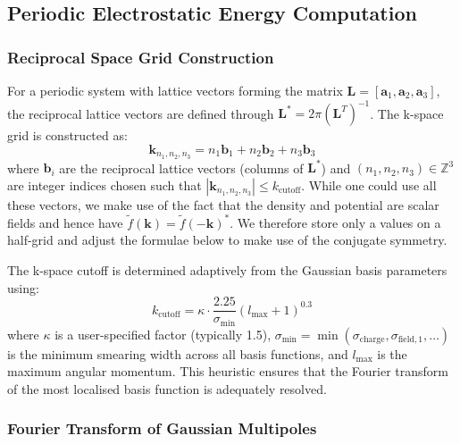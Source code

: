 \documentclass[aps,%
superscriptaddress,
 amsmath,amssymb,
floatfix,
twocolumn
]{revtex4-2}
\begin{document}
\subsection{Periodic Electrostatic Energy Computation}
\label{sec:si_periodic_electrostatics}

\subsubsection{Reciprocal Space Grid Construction}

For a periodic system with lattice vectors forming the matrix $\mathbf{L} = [\mathbf{a}_1, \mathbf{a}_2, \mathbf{a}_3]$, the reciprocal lattice vectors are defined through $\mathbf{L}^* = 2\pi(\mathbf{L}^T)^{-1}$. The k-space grid is constructed as:
\begin{equation}
\mathbf{k}_{n_1,n_2,n_3} = n_1 \mathbf{b}_1 + n_2 \mathbf{b}_2 + n_3 \mathbf{b}_3
\end{equation}
where $\mathbf{b}_i$ are the reciprocal lattice vectors (columns of $\mathbf{L}^*$) and $(n_1, n_2, n_3) \in \mathbb{Z}^3$ are integer indices chosen such that $|\mathbf{k}_{n_1,n_2,n_3}| \leq k_{\text{cutoff}}$. While one could use all these vectors, we make use of the fact that the density and potential are scalar fields and hence have $\tilde{f}(\mathbf{k}) = \tilde{f}(-\mathbf{k})^*$. We therefore store only a values on a half-grid and adjust the formulae below to make use of the conjugate symmetry. 

The k-space cutoff is determined adaptively from the Gaussian basis parameters using:
\begin{equation}
k_{\text{cutoff}} = \kappa \cdot \frac{2.25}{\sigma_{\text{min}}} (l_{\text{max}} + 1)^{0.3}
\end{equation}
where $\kappa$ is a user-specified factor (typically 1.5), $\sigma_{\text{min}} = \min(\sigma_{\text{charge}}, \sigma_{\text{field},1}, \ldots)$ is the minimum smearing width across all basis functions, and $l_{\text{max}}$ is the maximum angular momentum. This heuristic ensures that the Fourier transform of the most localised basis function is adequately resolved.



\subsubsection{Fourier Transform of Gaussian Multipoles}
\end{document}
